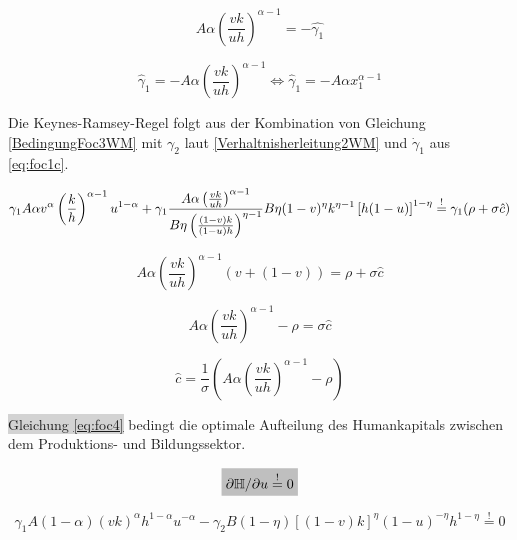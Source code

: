 	\begin{equation*}
		 A \alpha \left(\frac{vk}{uh}\right)^{\alpha -1} = - \hat{\gamma_{1}}
	\end{equation*}


	\begin{equation}
		\hat{\gamma}_1=-A\alpha \left(\frac{vk}{uh}\right)^{\alpha-1}\Longleftrightarrow \hat{\gamma}_1=-A\alpha x_1^{\alpha-1}\label{foc3}
	\end{equation}


Die Keynes-Ramsey-Regel folgt aus der Kombination von Gleichung \eqref{BedingungFoc3WM} mit $\gamma_2$ laut \eqref{Verhaltnisherleitung2WM} und $\dot{\gamma}_1$ aus \eqref{eq:foc1c}.


	\begin{equation}
		\gamma_{1}A \alpha v^{\alpha} \left(\frac{k}{h}\right)^{\alpha -1} u^{1- \alpha}+\gamma_1\frac{A\alpha \left(\frac{vk}{uh}\right)^{\alpha-1}}{B\eta\left(\frac{(1-v)k}{(1-u)h}\right)^{\eta-1}}{B\eta (1- v)^{\eta} k^{\eta-1} \left [ h(1-u) \right ]^{1- \eta}}\overset{!}{=} \gamma_{1}(\rho+\sigma\hat{c})\\
	\end{equation}


	\begin{equation*}
		A \alpha \left(\frac{vk}{uh}\right)^{\alpha -1}(v+(1-v))= \rho+\sigma\hat{c}
	\end{equation*}


	\begin{equation*}
		A \alpha \left(\frac{vk}{uh}\right)^{\alpha -1}- \rho = \sigma \hat{c}
	\end{equation*}


	\begin{equation}
		\boxed{\hat{c}=\frac{1}{\sigma}\left(A\alpha \left(\frac{vk}{uh}\right)^{\alpha -1}-\rho\right)}\label{eq:KRR}
	\end{equation}


\colorbox{lightgray}{Gleichung \eqref{eq:foc4}} bedingt die optimale Aufteilung des Humankapitals zwischen dem Produktions- und Bildungssektor. 


	\begin{equation*}
		\colorbox{lightgray}{$\partial\mathbb{H}/\partial u\overset{!}{=}0$}
	\end{equation*}


	\begin{equation}
		\gamma_1A(1-\alpha)(vk)^{\alpha}h^{1-\alpha}u^{-\alpha}-\gamma_2B(1-\eta)[(1-v)k]^\eta (1-u)^{-\eta} h^{1-\eta}\overset{!}{=}0
	\end{equation}


